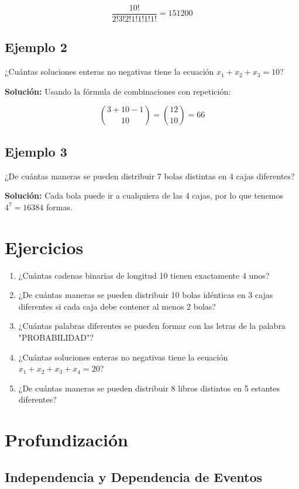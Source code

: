 \documentclass[letterpaper, 12pt]{article}
\begin{document}
	$$\frac{10!}{2!3!2!1!1!1!1!} = 151200$$
	
	\subsection{Ejemplo 2}
	
	¿Cuántas soluciones enteras no negativas tiene la ecuación $x_1 + x_2 + x_3 = 10$?
	
	\textbf{Solución:} Usando la fórmula de combinaciones con repetición:
	
	$$\binom{3+10-1}{10} = \binom{12}{10} = 66$$
	
	\subsection{Ejemplo 3}
	
	¿De cuántas maneras se pueden distribuir 7 bolas distintas en 4 cajas diferentes?
	
	\textbf{Solución:} Cada bola puede ir a cualquiera de las 4 cajas, por lo que tenemos $4^7 = 16384$ formas.
	
	\section{Ejercicios}
	
	\begin{enumerate}
		\item ¿Cuántas cadenas binarias de longitud 10 tienen exactamente 4 unos?
		\item ¿De cuántas maneras se pueden distribuir 10 bolas idénticas en 3 cajas diferentes si cada caja debe contener al menos 2 bolas?
		\item ¿Cuántas palabras diferentes se pueden formar con las letras de la palabra "PROBABILIDAD"?
		\item ¿Cuántas soluciones enteras no negativas tiene la ecuación $x_1 + x_2 + x_3 + x_4 = 20$?
		\item ¿De cuántas maneras se pueden distribuir 8 libros distintos en 5 estantes diferentes?
	\end{enumerate}
	
	
	\section{Profundización}
	\subsection{Independencia y Dependencia de Eventos}
	
\end{document}
